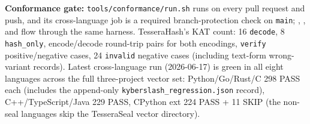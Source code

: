 \textbf{Conformance gate:} \texttt{tools/conformance/run.sh} runs on every pull request and push, and its cross-language job is a required branch-protection check on \texttt{main}; \tesseraid{}, \tesserahash{}, and \tesseraseal{} flow through the same harness. TesseraHash's KAT count: 16 \texttt{decode}, 8 \texttt{hash\_only}, encode/decode round-trip pairs for both encodings, \texttt{verify} positive/negative cases, 24 \texttt{invalid} negative cases (including text-form wrong-variant records). Latest cross-language run (2026-06-17) is green in all eight languages across the full three-project vector set: Python/Go/Rust/C 298 PASS each (includes the append-only \texttt{kyberslash\_regression.json} record), C++/TypeScript/Java 229 PASS, CPython ext 224 PASS + 11 SKIP (the non-seal languages skip the TesseraSeal vector directory).
